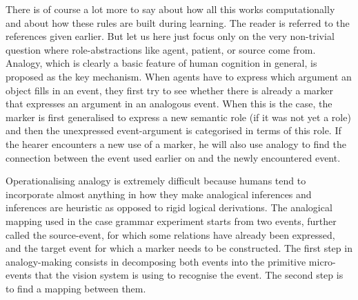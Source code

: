 There is of course a lot more to say about how all this works computationally and about how these rules are built during 
learning. The reader is referred to the references given earlier. 
But let us here just focus only on the very non-trivial question where role-abstractions 
like agent, patient, or source come from. Analogy, which is clearly a basic feature of human 
cognition in general, is proposed as the key mechanism.  When agents have to 
express which argument an object fills in an event, they first try to see whether there is already a marker that 
expresses an argument in an analogous event. When this is the case, the marker is first generalised to 
express a new semantic role (if it was not yet a role) and then the unexpressed event-argument is 
categorised in terms of this role. If the hearer encounters a new use of a marker, he will also use analogy to 
find the connection between the event used earlier on and the newly encountered event.

Operationalising analogy is extremely difficult because humans tend to incorporate almost anything in how they 
make analogical inferences and inferences are heuristic as opposed to rigid logical derivations. The analogical 
mapping used in the case grammar experiment starts from two events, further called the source-event, for which some relations have already been expressed, and the target event for which a marker needs to be constructed. The first step in analogy-making consists in decomposing both events into the primitive micro-events that the vision system is using to recognise the 
event. The second step is to find a mapping between them. 

